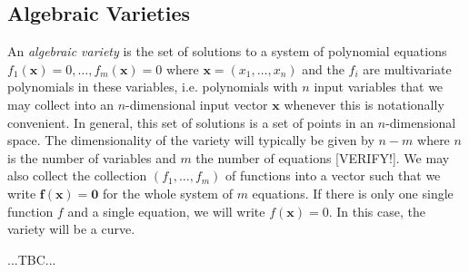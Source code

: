 \subsection{Algebraic Varieties}  %
An \emph{algebraic variety} is the set of solutions to a system of polynomial equations $f_1(\mathbf{x}) = 0, \ldots, f_m(\mathbf{x}) = 0$ where $\mathbf{x} = (x_1, \ldots, x_n)$ and the $f_i$ are multivariate polynomials in these variables, i.e. polynomials with $n$ input variables that we may collect into an $n$-dimensional input vector $\mathbf{x}$ whenever this is notationally convenient. In general, this set of solutions is a set of points in an $n$-dimensional space. The dimensionality of the variety will typically be given by $n-m$ where $n$ is the number of variables and $m$ the number of equations [VERIFY!]. We may also collect the collection $(f_1, \ldots , f_m)$ of functions into a vector such that we write $\mathbf{f(x) = 0}$ for the whole system of $m$ equations. If there is only one single function $f$ and a single equation, we will write $f(\mathbf{x}) = 0$. In this case, the variety will be a curve. 



 ...TBC...




